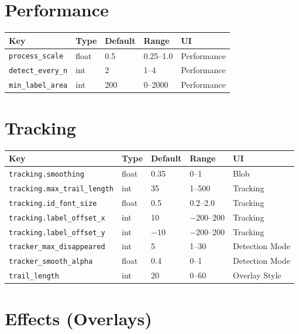 \documentclass[11pt,a4paper,openany]{report}
\begin{document}
\section{Performance}

\begin{tabularx}{\linewidth}{@{}lllXl@{}}
    \toprule
    \textbf{Key} & \textbf{Type} & \textbf{Default} & \textbf{Range} & \textbf{UI} \\
    \midrule
    \texttt{process\_scale}    & float & 0.5  & 0.25--1.0 & Performance \\
    \texttt{detect\_every\_n}  & int   & 2    & 1--4      & Performance \\
    \texttt{min\_label\_area}  & int   & 200  & 0--2000   & Performance \\
    \bottomrule
\end{tabularx}

\section{Tracking}

\begin{tabularx}{\linewidth}{@{}lllXl@{}}
    \toprule
    \textbf{Key} & \textbf{Type} & \textbf{Default} & \textbf{Range} & \textbf{UI} \\
    \midrule
    \texttt{tracking.smoothing}        & float & 0.35 & 0--1         & Blob \\
    \texttt{tracking.max\_trail\_length}& int  & 35   & 1--500       & Tracking \\
    \texttt{tracking.id\_font\_size}   & float & 0.5  & 0.2--2.0     & Tracking \\
    \texttt{tracking.label\_offset\_x} & int   & 10   & $-200$--$200$ & Tracking \\
    \texttt{tracking.label\_offset\_y} & int   & $-10$ & $-200$--$200$ & Tracking \\
    \texttt{tracker\_max\_disappeared} & int   & 5    & 1--30        & Detection Mode \\
    \texttt{tracker\_smooth\_alpha}    & float & 0.4  & 0--1         & Detection Mode \\
    \texttt{trail\_length}             & int   & 20   & 0--60        & Overlay Style \\
    \bottomrule
\end{tabularx}

\section{Effects (Overlays)}
\end{document}
